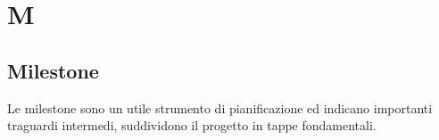 \section{M}
\subsection{Milestone}
Le milestone sono un utile strumento di pianificazione ed indicano importanti traguardi intermedi,  suddividono il progetto in tappe fondamentali.
\clearpage